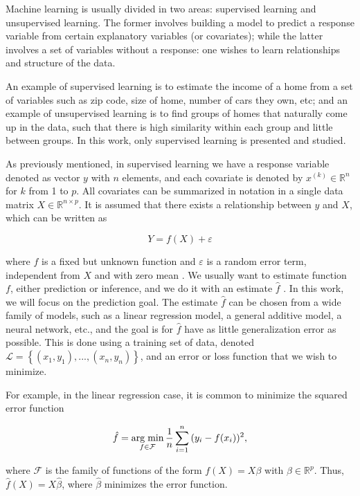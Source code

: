 Machine learning is usually divided in two areas: supervised learning and unsupervised learning. The former involves building a model to predict a response variable from certain explanatory variables (or covariates); while the latter involves a set of variables without a response: one wishes to learn relationships and structure of the data.

An example of supervised learning is to estimate the income of a home from a set of variables such as zip code, size of home, number of cars they own, etc; and an example of unsupervised learning is to find groups of homes that naturally come up in the data, such that there is high similarity within each group and little between groups. In this work, only supervised learning is presented and studied.

As previously mentioned, in supervised learning we have a response variable denoted as vector $y$ with $n$ elements, and each covariate is denoted by $x^{(k)} \in \mathbb{R}^n$ for $k$ from 1 to $p$. All covariates can be summarized in notation in a single data matrix $X \in \mathbb{R}^{n \times p}$. It is assumed that there exists a relationship between $y$ and $X$, which can be written as

\begin{equation}
  \label{eq:general_learning_model}
  Y = f(X) + \varepsilon
\end{equation}

where $f$ is a fixed but unknown function and $\varepsilon$ is a random error term, independent from $X$ and with zero mean \cite[p.~16]{james2013introduction}. We usually want to estimate function $f$, either prediction or inference, and we do it with an estimate $\hat{f}$ \cite[p.~17]{james2013introduction}.
In this work, we will focus on the prediction goal.
The estimate $\hat{f}$ can be chosen from a wide family of models, such as a linear regression model, a general additive model, a neural network, etc., and the goal is for $\hat{f}$ have as little generalization error as possible. This is done using a training set of data, denoted $\mathcal{L} = \left\{ (x_1, y_1), ..., (x_n, y_n) \right\}$, and an error or loss function that we wish to minimize.

For example, in the linear regression case, it is common to minimize the squared error function

$$
  \hat{f} = \operatorname*{arg\; min}_{f \in \mathcal{F}} \frac{1}{n} \sum_{i = 1}^n{ ( y_i - f(x_i) ) ^ 2},
$$

where $\mathcal{F}$ is the family of functions of the form $f(X) = X\beta$ with $\beta \in \mathbb{R}^p$. Thus, $\hat{f}(X) = X \hat{\beta}$, where $\hat{\beta}$ minimizes the error function.

